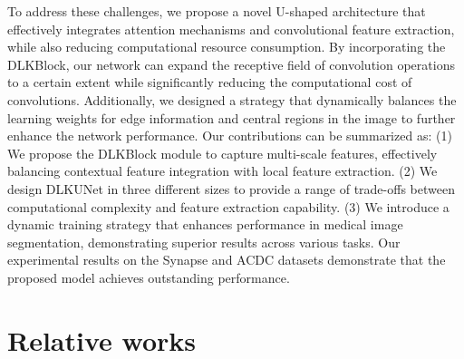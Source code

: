 \documentclass[sn-mathphys-num]{sn-jnl}
\theoremstyle{thmstyleone}%
\theoremstyle{thmstyletwo}%
\theoremstyle{thmstylethree}%
\begin{document}
To address these challenges, we propose a novel U-shaped architecture that effectively integrates attention mechanisms and convolutional feature extraction, while also reducing computational resource consumption.
By incorporating the DLKBlock, our network can expand the receptive field of convolution operations to a certain extent while significantly reducing the computational cost of convolutions.
Additionally, we designed a strategy that dynamically balances the learning weights for edge information and central regions in the image to further enhance the network performance.
Our contributions can be summarized as:
(1) We propose the DLKBlock module to capture multi-scale features, effectively balancing contextual feature integration with local feature extraction.
(2) We design DLKUNet in three different sizes to provide a range of trade-offs between computational complexity and feature extraction capability.
(3) We introduce a dynamic training strategy that enhances performance in medical image segmentation, demonstrating superior results across various tasks.
Our experimental results on the Synapse and ACDC datasets demonstrate that the proposed model achieves outstanding performance.

\section{Relative works}\label{sec2}
\end{document}
